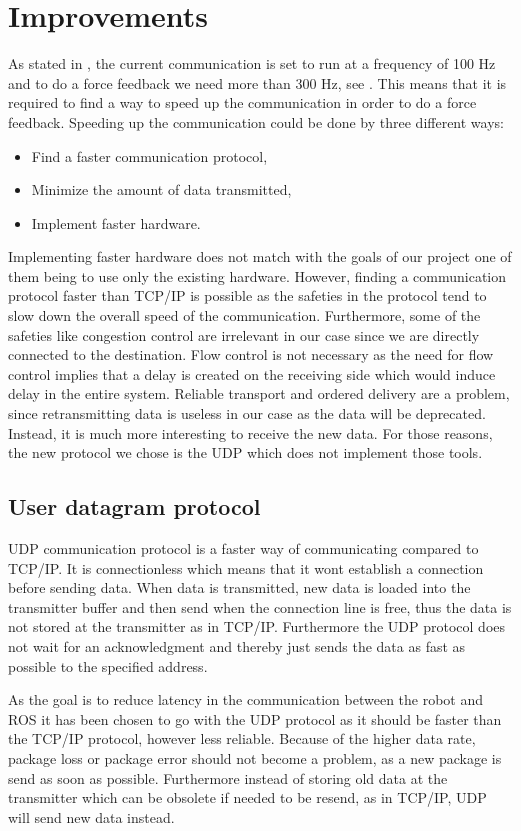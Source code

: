 \chapter{Improvements}\label{sec:improvements}
As stated in , the current communication is set to run at a frequency of 100 Hz and to do a force feedback we need more than 300 Hz, see . This means that it is required to find a way to speed up the communication in order to do a force feedback. Speeding up the communication could be done by three different ways:

\begin{itemize}
	\item Find a faster communication protocol,
	\item Minimize the amount of data transmitted,
	\item Implement faster hardware.	
\end{itemize}

Implementing faster hardware does not match with the goals of our project one of them being to use only the existing hardware.
However, finding a communication protocol faster than TCP/IP is possible as the safeties in the protocol tend to slow down the overall speed of the communication. Furthermore, some of the safeties like congestion control are irrelevant in our case since we are directly connected to the destination. Flow control is not necessary as the need for flow control implies that a delay is created on the receiving side which would induce delay in the entire system. Reliable transport and ordered delivery are a problem, since retransmitting data is useless in our case as the data will be deprecated. Instead, it is much more interesting to receive the new data. For those reasons, the new protocol we chose is the \gls{UDP} which does not implement those tools.

\section*{User datagram protocol}
\gls{UDP} communication protocol is a faster way of communicating compared to TCP/IP. It is connectionless which means that it wont establish a connection before sending data. When data is transmitted, new data is loaded into the transmitter buffer and then send when the connection line is free, thus the data is not stored at the transmitter as in TCP/IP. Furthermore the \gls{UDP} protocol does not wait for an acknowledgment and thereby just sends the data as fast as possible to the specified address.

As the goal is to reduce latency in the communication between the robot and ROS it has been chosen to go with the \gls{UDP} protocol as it should be faster than the TCP/IP protocol, however less reliable. Because of the higher data rate, package loss or package error should not become a problem, as a new package is send as soon as possible. Furthermore instead of storing old data at the transmitter which can be obsolete if needed to be resend, as in TCP/IP, \gls{UDP} will send new data instead.
